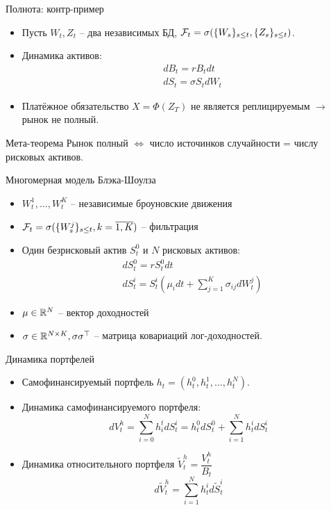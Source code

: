 \documentclass[aspectratio=169]{beamer}
\begin{document}
\begin{frame}{Полнота: контр-пример}
    \begin{itemize}
        \item Пусть $W_t, Z_t$ -- два независимых БД, $\mathcal{F}_t = \sigma( \{W_s\}_{s\leq t}, \{Z_s\}_{s\leq t} )$.
        \item Динамика активов:
            \begin{align*}
                &dB_t = r B_t dt \\
                &dS_t = \sigma S_t dW_t
            \end{align*}
        \item Платёжное обязательство $X = \Phi(Z_T)$ не является реплицируемым $\to$ рынок не полный.
    \end{itemize}
    \begin{block}{Мета-теорема}
        Рынок полный $\Leftrightarrow$ число источинков случайности = числу рисковых активов.
    \end{block}
\end{frame}

\begin{frame}{Многомерная модель Блэка-Шоулза}
    \begin{itemize}
        \item $W_t^1, \ldots, W_t^K$ -- независимые броуновские движения
        \item $\mathcal{F}_t = \sigma(\{W_s^j\}_{s\leq t}, k=\overline{1,K})$ -- фильтрация
        \item Один безрисковый актив $S_t^0$ и $N$ рисковых активов:
        \begin{align*}
            &dS^0_t = r S^0_t dt \\
            &dS^i_t = S^i_t \left( \mu_i dt + \sum_{j=1}^K \sigma_{ij} dW_t^j \right)
        \end{align*}
        \item $\mu \in \mathbb{R}^N$ -- вектор доходностей
        \item $\sigma \in \mathbb{R}^{N\times K}, \sigma \sigma^{\top}$ -- матрица ковариаций лог-доходностей.
    \end{itemize}
\end{frame}

\begin{frame}{Динамика портфелей}
    \begin{itemize}
        \item Самофинансируемый портфель $h_t = (h_t^0, h_t^1, \ldots, h_t^N)$.
        \item Динамика самофинансируемого портфеля:
        $$
            dV_t^h = \sum_{i=0}^N h^t_i dS_t^i = h_t^0 dS^0_t + \sum_{i=1}^N h_t^i dS_t^i
        $$
        \item Динамика относительного портфеля $\tilde{V}^h_t = \dfrac{V_t^h}{B_t}$
        $$
            d\tilde{V}_t^h = \sum_{i=1}^N h_t^i d\tilde{S}_t^i
        $$
    \end{itemize}
\end{frame}
\end{document}
